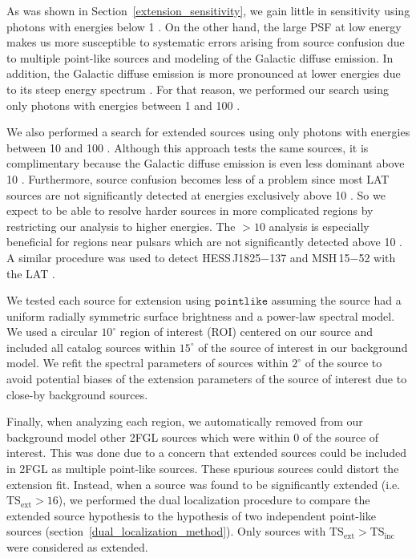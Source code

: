 \documentclass[12pt,preprint]{aastex}
\newcommand{\gev}{\text{GeV}\xspace}
\newcommand{\tsext}{{\ensuremath{\text{TS}_{\text{ext}}}}\xspace}
\newcommand{\tsinc}{\ensuremath{\text{TS}_{\text{inc}}}\xspace}
\newcommand{\pointlike}{\ensuremath{\mathtt{pointlike}}\xspace}
\newcommand{\degree}{^\circ\xspace}
\begin{document}
As was shown in Section~\ref{extension_sensitivity}, we gain little in
sensitivity using photons with energies below 1 \gev. On the other hand,
the large PSF at low energy makes us more susceptible to systematic
errors arising from source confusion due to multiple point-like sources
and modeling of the Galactic diffuse emission. In addition, the Galactic
diffuse emission is more pronounced at lower energies due to its steep
energy spectrum \citep{intermediate_diffuse_lat}.  For that reason,
we performed our search using only photons with energies between 1 \gev
and 100 \gev.

We also performed a search for extended sources using only photons with energies
between 10 \gev and 100 \gev. 
Although this approach tests the same
sources, it is complimentary because the Galactic diffuse
emission is even less dominant above 10 \gev. Furthermore, source
confusion becomes less of a problem since most LAT sources are not
significantly detected at energies exclusively above 10 \gev. So we
expect to be able to resolve harder sources in more complicated regions
by restricting our analysis to higher energies. The $>10$ \gev
analysis is
especially
beneficial for regions near pulsars which are not significantly detected 
above 10 \gev. A similar procedure was
used to detect HESS\,J1825$-$137 and MSH\,15$-$52 with the LAT
\citep{msh1552,fermi_hess_j1825}.

We tested each source for extension using
\pointlike
assuming the source had a uniform radially symmetric surface brightness
and a power-law spectral model.
We used a circular $10\degree$ region of interest (ROI) centered on our source and
included all catalog sources within $15\degree$ of the source of interest
in our background model.
We refit the spectral parameters of sources within $2\degree$ of the source
to avoid potential biases of the extension parameters of the source of
interest due to close-by background sources.

Finally, when analyzing each region, we automatically removed from
our background model other 2FGL sources which were within 0 of
the source of interest. This was done due
to a concern that extended sources could be included in 2FGL as multiple
point-like sources. These spurious sources could distort the extension
fit.  Instead, when a source was found to be significantly extended
(i.e. $\tsext>16$), we performed the dual localization procedure 
to compare the extended source
hypothesis to the hypothesis of two independent point-like sources
(section~\ref{dual_localization_method}). Only
sources with $\tsext>\tsinc$ were considered as extended.
\end{document}
